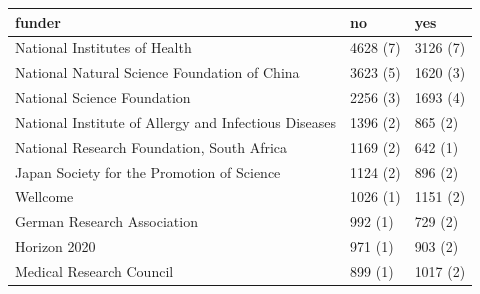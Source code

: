\begin{table}[ht]
\centering
\begin{tabular}{lll}
 funder & no & yes \\ 
  \hline
National Institutes of Health & 4628 (7) & 3126 (7) \\ 
  National Natural Science Foundation of China & 3623 (5) & 1620 (3) \\ 
  National Science Foundation & 2256 (3) & 1693 (4) \\ 
  National Institute of Allergy and Infectious Diseases & 1396 (2) & 865 (2) \\ 
  National Research Foundation, South Africa & 1169 (2) & 642 (1) \\ 
  Japan Society for the Promotion of Science & 1124 (2) & 896 (2) \\ 
  Wellcome & 1026 (1) & 1151 (2) \\ 
  German Research Association & 992 (1) & 729 (2) \\ 
  Horizon 2020 & 971 (1) & 903 (2) \\ 
  Medical Research Council & 899 (1) & 1017 (2) \\ 
  \end{tabular}
\end{table}
